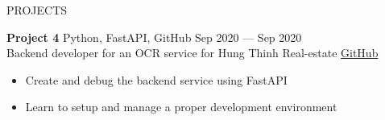 \documentclass{resume} %
\begin{document}
\begin{rSection}{PROJECTS}
\begin{itemize}
  \end{itemize}
  \item \textbf{Project 4} {Python, FastAPI, GitHub} \hfill Sep 2020 --- Sep 2020 \\
  Backend developer for an OCR service for Hung Thinh Real-estate \hfill \href{https://github.com/Smithienious/OCR-Docker}{GitHub}
  \begin{itemize}
    \item Create and debug the backend service using FastAPI
    \item Learn to setup and manage a proper development environment
  \end{itemize}
\end{rSection}






\end{document}
